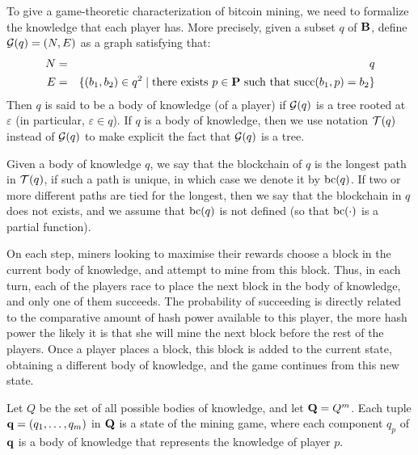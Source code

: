 \documentclass{article}
\begin{document}
To give a game-theoretic characterization of bitcoin mining, we need to formalize the knowledge that each player has. More precisely, given a subset $q$ of $\mathbf{B}$, define $\mathcal{G}(q) = (N,E)$ as a graph satisfying that:
\begin{eqnarray*}
N &=& q\\
E &=& \{ (b_1,b_2) \in q^2 \mid \text{there exists } p \in \mathbf{P} \text{ such that }\text{succ}(b_1,p) = b_2\}
\end{eqnarray*}
Then $q$ is said to be a body of knowledge (of a player) if $\mathcal{G}(q)$ is a tree rooted at $\varepsilon$ (in particular, $\varepsilon \in q$). If $q$ is a body of knowledge, then we use notation $\mathcal{T}(q)$ instead of $\mathcal{G}(q)$ to make explicit the fact that $\mathcal{G}(q)$ is a tree.

Given a body of knowledge $q$, we say that the blockchain of $q$ is the longest path in $\mathcal{T}(q)$, if such a path is unique, in which case we denote it by $\text{bc}(q)$. If two or more different paths are tied for the longest, then we say that the blockchain in $q$ does not exists, and we assume that $\text{bc}(q)$ is not defined (so that $\text{bc}(\cdot)$ is a partial function).

On each step, miners looking to maximise their rewards choose a block in the current body of knowledge, and attempt to mine from this block. Thus, in each turn, each of the players race to place the next block in the body of knowledge, and only one of them succeeds. The probability of succeeding is directly related to the comparative amount of hash power available to this player, the more hash power the likely it is that she will mine the next block before the rest of the players. Once a player places a block, this block is added to the current state, obtaining a different body of knowledge, and the game continues from this new state. 

Let $Q$ be the set of all possible bodies of knowledge, and let $\mathbf{Q} = Q^m$. Each tuple $\mathbf{q} = (q_1, \ldots, q_m)$ in $\mathbf{Q}$ is a state of the mining game, where each component $q_p$ of $\mathbf{q}$ is a body of knowledge that represents the knowledge of player $p$.
\end{document}
